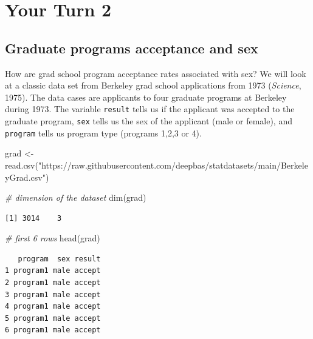 \documentclass[
]{book}
\newenvironment{Shaded}{\begin{snugshade}}{\end{snugshade}}
\newcommand{\CommentTok}[1]{\textcolor[rgb]{0.56,0.35,0.01}{\textit{#1}}}
\newcommand{\FunctionTok}[1]{\textcolor[rgb]{0.00,0.00,0.00}{#1}}
\newcommand{\NormalTok}[1]{#1}
\newcommand{\OtherTok}[1]{\textcolor[rgb]{0.56,0.35,0.01}{#1}}
\newcommand{\StringTok}[1]{\textcolor[rgb]{0.31,0.60,0.02}{#1}}
\begin{document}
\hypertarget{your-turn-2-2}{%
\section{Your Turn 2}\label{your-turn-2-2}}

\hypertarget{graduate-programs-acceptance-and-sex}{%
\subsection{Graduate programs acceptance and sex}\label{graduate-programs-acceptance-and-sex}}

How are grad school program acceptance rates associated with sex? We will look at a classic data set from Berkeley grad school applications from 1973 (\emph{Science}, 1975). The data cases are applicants to four graduate programs at Berkeley during 1973. The variable \texttt{result} tells us if the applicant was accepted to the graduate program, \texttt{sex} tells us the sex of the applicant (male or female), and \texttt{program} tells us program type (programs 1,2,3 or 4).

\begin{Shaded}
\begin{Highlighting}[]
\NormalTok{grad }\OtherTok{\textless{}{-}} \FunctionTok{read.csv}\NormalTok{(}\StringTok{"https://raw.githubusercontent.com/deepbas/statdatasets/main/BerkeleyGrad.csv"}\NormalTok{)}
\end{Highlighting}
\end{Shaded}

\begin{Shaded}
\begin{Highlighting}[]
\CommentTok{\# dimension of the dataset}
\FunctionTok{dim}\NormalTok{(grad)}
\end{Highlighting}
\end{Shaded}

\begin{verbatim}
[1] 3014    3
\end{verbatim}

\begin{Shaded}
\begin{Highlighting}[]
\CommentTok{\# first 6 rows}
\FunctionTok{head}\NormalTok{(grad)}
\end{Highlighting}
\end{Shaded}

\begin{verbatim}
   program  sex result
1 program1 male accept
2 program1 male accept
3 program1 male accept
4 program1 male accept
5 program1 male accept
6 program1 male accept
\end{verbatim}
\end{document}
